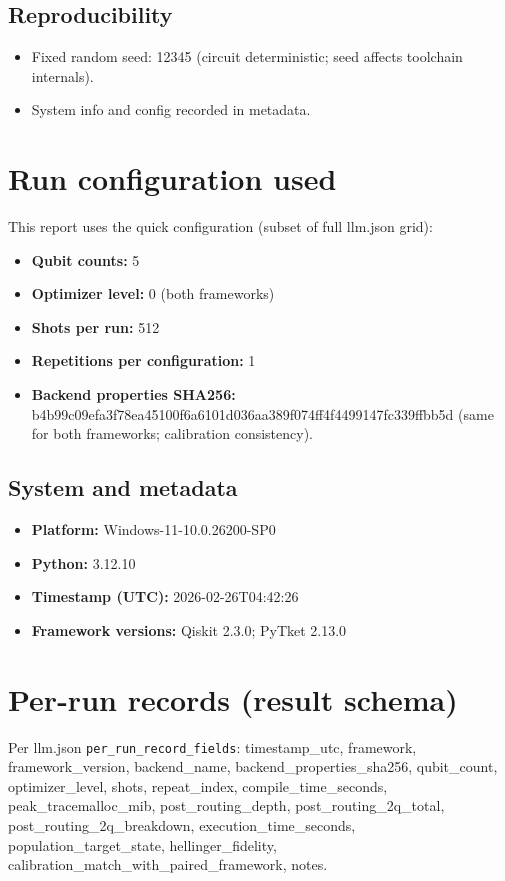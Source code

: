 \documentclass[11pt,a4paper]{article}
\begin{document}
\subsection{Reproducibility}
\begin{itemize}
  \item Fixed random seed: 12345 (circuit deterministic; seed affects toolchain internals).
  \item System info and config recorded in metadata.
\end{itemize}

\section{Run configuration used}

This report uses the quick configuration (subset of full llm.json grid):
\begin{itemize}
  \item \textbf{Qubit counts:} 5
  \item \textbf{Optimizer level:} 0 (both frameworks)
  \item \textbf{Shots per run:} 512
  \item \textbf{Repetitions per configuration:} 1
  \item \textbf{Backend properties SHA256:} b4b99c09efa3f78ea45100f6a6101d036aa389f074ff4f4499147fc339ffbb5d (same for both frameworks; calibration consistency).
\end{itemize}

\subsection{System and metadata}
\begin{itemize}
  \item \textbf{Platform:} Windows-11-10.0.26200-SP0
  \item \textbf{Python:} 3.12.10
  \item \textbf{Timestamp (UTC):} 2026-02-26T04:42:26
  \item \textbf{Framework versions:} Qiskit 2.3.0; PyTket 2.13.0
\end{itemize}

\section{Per-run records (result schema)}

Per llm.json \texttt{per\_run\_record\_fields}: timestamp\_utc, framework, framework\_version, backend\_name, backend\_properties\_sha256, qubit\_count, optimizer\_level, shots, repeat\_index, compile\_time\_seconds, peak\_tracemalloc\_mib, post\_routing\_depth, post\_routing\_2q\_total, post\_routing\_2q\_breakdown, execution\_time\_seconds, population\_target\_state, hellinger\_fidelity, calibration\_match\_with\_paired\_framework, notes.
\end{document}
